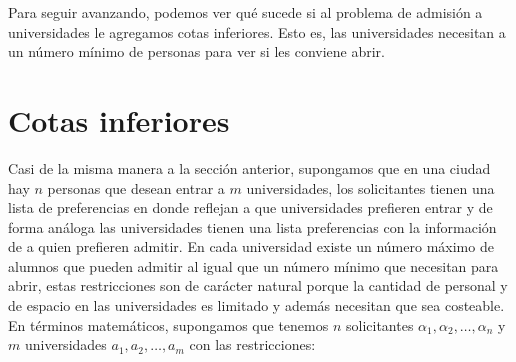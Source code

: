 Para seguir avanzando, podemos ver qué sucede si al problema de admisión a universidades le agregamos cotas inferiores. Esto es, las universidades necesitan a un número mínimo de personas para ver si les conviene abrir. 

\section{Cotas inferiores}

Casi de la misma manera a la sección anterior, supongamos que en una ciudad hay $n$ personas que desean entrar a $m$ universidades, los solicitantes tienen una lista de preferencias en donde reflejan a que universidades prefieren entrar y de forma análoga las universidades tienen una lista preferencias con la información de a quien prefieren admitir. En cada universidad existe un número máximo de alumnos que pueden admitir al igual que un número mínimo que necesitan para abrir, estas restricciones son de carácter natural porque la cantidad de personal y de espacio en las universidades es limitado y además necesitan que sea costeable. %
En términos matemáticos, supongamos que tenemos $n$ solicitantes $\alpha_1,\alpha_2,\ldots,\alpha_n$ y $m$ universidades $a_1, a_2,\ldots,a_m$ con las restricciones:
